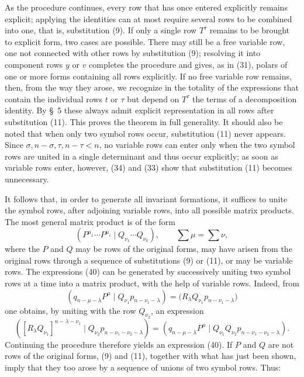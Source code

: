 \documentclass[10pt]{article}
\newcommand{\pair}[2]{(#1\mid #2)}
\begin{document}
As the procedure continues, every row that has once entered explicitly
remains explicit; applying the identities can at most require several rows
to be combined into one, that is, substitution (9). If only a single row
$T^\tau$ remains to be brought to explicit form, two cases are possible.
There may still be a free variable row, one not connected with other rows by
substitution (9); resolving it into component rows $y$ or $v$ completes the
procedure and gives, as in (31), polars of one or more forms containing all
rows explicitly. If no free variable row remains, then, from the way they
arose, we recognize in the totality of the expressions that contain the
individual rows $t$ or $\tau$ but depend on $T^\tau$ the terms of a
decomposition identity. By \S\ 5 these always admit explicit representation
in all rows after substitution (11). This proves the theorem in full
generality. It should also be noted that when only two symbol rows occur,
substitution (11) never appears. Since
$\sigma,n-\sigma,\tau,n-\tau<n$, no variable rows can enter only when the two
symbol rows are united in a single determinant and thus occur explicitly;
as soon as variable rows enter, however, (34) and (33) show that substitution
(11) becomes unnecessary.

It follows that, in order to generate all invariant formations, it suffices
to unite the symbol rows, after adjoining variable rows, into all possible
matrix products. The most general matrix product is of the form
\begin{equation}
 \pair{P^{\mu_1}\cdots P^{\mu_i}}{Q_{\nu_1}\cdots Q_{\nu_k}},
 \qquad \sum\mu=\sum\nu,
\tag{40}
\end{equation}
where the $P$ and $Q$ may be rows of the original forms, may have arisen from
the original rows through a sequence of substitutions (9) or (11), or may be
variable rows. The expressions (40) can be generated by successively uniting
two symbol rows at a time into a matrix product, with the help of variable
rows. Indeed, from
\[
 \pair{q_{n-\mu-\lambda}P^\mu}
 {Q_{\nu_1}p_{n-\nu_1-\lambda}}
 =\bigl(R_\lambda Q_{\nu_1}p_{n-\nu_1-\lambda}\bigr)
\]
one obtains, by uniting with the row $Q_{\nu_2}$, an expression
\[
 \pair{[R_\lambda Q_{\nu_1}]^{n-\lambda-\nu_1}}
 {Q_{\nu_2}p_{n-\nu_1-\nu_2-\lambda}}
 =\pair{q_{n-\mu-\lambda}P^\mu}
 {Q_{\nu_1}Q_{\nu_2}p_{n-\nu_1-\nu_2-\lambda}}.
\]
Continuing the procedure therefore yields an expression (40). If $P$ and $Q$
are not rows of the original forms, (9) and (11), together with what has just
been shown, imply that they too arose by a sequence of unions of two symbol
rows. Thus:
\end{document}
